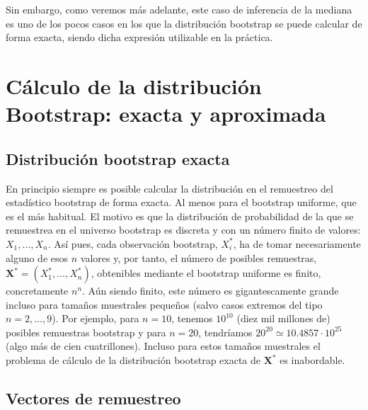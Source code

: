 \documentclass[
]{book}
\theoremstyle{break}
\theoremstyle{definition}
\theoremstyle{definition}
\theoremstyle{definition}
\theoremstyle{definition}
\theoremstyle{remark}
\begin{document}
Sin embargo, como veremos más adelante, este caso de inferencia de la
mediana es uno de los pocos casos en los que la distribución bootstrap
se puede calcular de forma exacta, siendo dicha expresión utilizable en
la práctica.

\hypertarget{cuxe1lculo-de-la-distribuciuxf3n-bootstrap-exacta-y-aproximada}{%
\section{Cálculo de la distribución Bootstrap: exacta y aproximada}\label{cuxe1lculo-de-la-distribuciuxf3n-bootstrap-exacta-y-aproximada}}

\hypertarget{distribuciuxf3n-bootstrap-exacta}{%
\subsection{Distribución bootstrap exacta}\label{distribuciuxf3n-bootstrap-exacta}}

En principio siempre es posible calcular la distribución en el
remuestreo del estadístico bootstrap de forma exacta. Al menos para el
bootstrap uniforme, que es el más habitual. El motivo es que la
distribución de probabilidad de la que se remuestrea en el universo
bootstrap es discreta y con un número finito de valores: \(X_1,\ldots ,X_n\). Así pues, cada observación bootstrap, \(X_i^{\ast}\), ha de
tomar necesariamente alguno de esos \(n\) valores y, por tanto, el número
de posibles remuestras, \(\mathbf{X}^{\ast}=\left( X_1^{\ast },\ldots ,X_n^{\ast} \right)\), obtenibles mediante el bootstrap
uniforme es finito, concretamente \(n^{n}\). Aún siendo finito, este
número es gigantescamente grande incluso para tamaños muestrales
pequeños (salvo casos extremos del tipo \(n=2,\ldots ,9\)). Por ejemplo,
para \(n=10\), tenemos \(10^{10}\) (diez mil millones de) posibles
remuestras bootstrap y para \(n=20\), tendríamos
\(20^{20}\simeq 10.4857\cdot 10^{25}\) (algo más de cien
cuatrillones). Incluso para estos tamaños muestrales el problema de
cálculo de la distribución bootstrap exacta de
\(\mathbf{X}^{\ast}\) es inabordable.

\hypertarget{vectores-de-remuestreo}{%
\subsection{Vectores de remuestreo}\label{vectores-de-remuestreo}}
\end{document}
